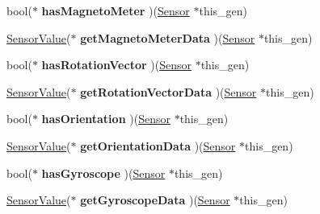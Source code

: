 \begin{DoxyCompactItemize}
\item 
\hypertarget{struct___sensor_a62cc8c82d46be0eaf4024bb777b967e7}{bool($\ast$ {\bfseries has\-Magneto\-Meter} )(\hyperlink{struct___sensor}{Sensor} $\ast$this\-\_\-gen)}\label{struct___sensor_a62cc8c82d46be0eaf4024bb777b967e7}

\item 
\hypertarget{struct___sensor_a3d0ea3194c2dfd616c3bad69d32a5a45}{\hyperlink{struct___sensor_value}{Sensor\-Value}($\ast$ {\bfseries get\-Magneto\-Meter\-Data} )(\hyperlink{struct___sensor}{Sensor} $\ast$this\-\_\-gen)}\label{struct___sensor_a3d0ea3194c2dfd616c3bad69d32a5a45}

\item 
\hypertarget{struct___sensor_a0810ed96bcf5a782787da77985269e17}{bool($\ast$ {\bfseries has\-Rotation\-Vector} )(\hyperlink{struct___sensor}{Sensor} $\ast$this\-\_\-gen)}\label{struct___sensor_a0810ed96bcf5a782787da77985269e17}

\item 
\hypertarget{struct___sensor_a65ee5ec68cc65fc41efe211264b17742}{\hyperlink{struct___sensor_value}{Sensor\-Value}($\ast$ {\bfseries get\-Rotation\-Vector\-Data} )(\hyperlink{struct___sensor}{Sensor} $\ast$this\-\_\-gen)}\label{struct___sensor_a65ee5ec68cc65fc41efe211264b17742}

\item 
\hypertarget{struct___sensor_a325ce97e802fecde260d22c47cdf608c}{bool($\ast$ {\bfseries has\-Orientation} )(\hyperlink{struct___sensor}{Sensor} $\ast$this\-\_\-gen)}\label{struct___sensor_a325ce97e802fecde260d22c47cdf608c}

\item 
\hypertarget{struct___sensor_adff208838f2be494237f7ebbd1c0946d}{\hyperlink{struct___sensor_value}{Sensor\-Value}($\ast$ {\bfseries get\-Orientation\-Data} )(\hyperlink{struct___sensor}{Sensor} $\ast$this\-\_\-gen)}\label{struct___sensor_adff208838f2be494237f7ebbd1c0946d}

\item 
\hypertarget{struct___sensor_a6d042a1909f3f5b21ecd4434c3385959}{bool($\ast$ {\bfseries has\-Gyroscope} )(\hyperlink{struct___sensor}{Sensor} $\ast$this\-\_\-gen)}\label{struct___sensor_a6d042a1909f3f5b21ecd4434c3385959}

\item 
\hypertarget{struct___sensor_a2ed489193d9bffea672d2eefece3da44}{\hyperlink{struct___sensor_value}{Sensor\-Value}($\ast$ {\bfseries get\-Gyroscope\-Data} )(\hyperlink{struct___sensor}{Sensor} $\ast$this\-\_\-gen)}\label{struct___sensor_a2ed489193d9bffea672d2eefece3da44}


\end{DoxyCompactItemize}
